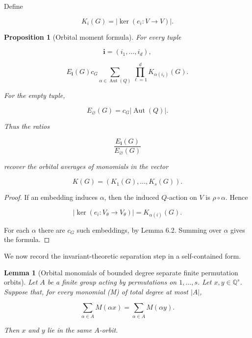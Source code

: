 \documentclass[11pt]{article}
\newtheorem{proposition}[theorem]{Proposition}
\newtheorem{lemma}[theorem]{Lemma}
\begin{document}
Define

\[
K_i(G)=|\ker(e_i:V\to V)|.
\]

\begin{proposition}[Orbital moment formula]
For every tuple

\[
\mathbf i=(i_1,\ldots,i_d),
\]

\[
E_{\mathbf i}(G)
c_G
\sum_{\alpha\in\operatorname{Aut}(Q)}
\prod_{\ell=1}^{d}
K_{\alpha(i_\ell)}(G).
\]

For the empty tuple,

\[
E_{\varnothing}(G)=c_G|\operatorname{Aut}(Q)|.
\]

Thus the ratios

\[
\frac{E_{\mathbf i}(G)}{E_{\varnothing}(G)}
\]

recover the orbital averages of monomials in the vector

\[
K(G)=(K_1(G),\ldots,K_s(G)).
\]

\end{proposition}

\begin{proof}
If an embedding induces $\alpha$, then the induced $Q$-action on $V$ is $\rho\circ\alpha$. Hence

\[
|\ker(e_i:V_\theta\to V_\theta)|
=K_{\alpha(i)}(G).
\]

For each $\alpha$ there are $c_G$ such embeddings, by Lemma 6.2. Summing over $\alpha$ gives the formula.

\end{proof}

We now record the invariant-theoretic separation step in a self-contained form.

\begin{lemma}[Orbital monomials of bounded degree separate finite permutation orbits]
Let $A$ be a finite group acting by permutations on ${1,\ldots,s}$. Let $x,y\in\mathbb Q^s$. Suppose that, for every monomial (M) of total degree at most $|A|$,

\[
\sum_{\alpha\in A}M(\alpha x)
=\sum_{\alpha\in A}M(\alpha y).
\]

Then $x$ and $y$ lie in the same $A$-orbit.

\end{lemma}
\end{document}
